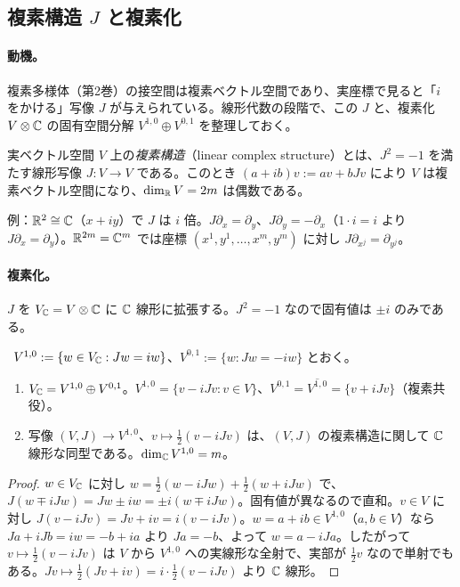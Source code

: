 \subsection{複素構造 $J$ と複素化}
\paragraph{動機。}複素多様体（第2巻）の接空間は複素ベクトル空間であり、実座標で見ると「$i$ をかける」写像 $J$ が与えられている。線形代数の段階で、この $J$ と、複素化 $V\otimes\mathbb C$ の固有空間分解 $V^{1,0}\oplus V^{0,1}$ を整理しておく。

\begin{defn}
実ベクトル空間 $V$ 上の\emph{複素構造}（linear complex structure）とは、$J^2=-1$ を満たす線形写像 $J:V\to V$ である。このとき $(a+ib)v:=av+bJv$ により $V$ は複素ベクトル空間になり、$\dim_{\mathbb R}V=2m$ は偶数である。
\end{defn}

例：$\mathbb R^2\cong\mathbb C$（$x+iy$）で $J$ は $i$ 倍。$J\partial_x=\partial_y$、$J\partial_y=-\partial_x$（$1\cdot i=i$ より $J\partial_x=\partial_y$）。$\mathbb R^{2m}=\mathbb C^m$ では座標 $(x^1,y^1,\dots,x^m,y^m)$ に対し $J\partial_{x^j}=\partial_{y^j}$。

\paragraph{複素化。}$J$ を $V_{\mathbb C}=V\otimes\mathbb C$ に $\mathbb C$ 線形に拡張する。$J^2=-1$ なので固有値は $\pm i$ のみである。

\begin{prop}\label{A:prop:V10}
\tP\ $V^{1,0}:=\{w\in V_{\mathbb C}:Jw=iw\}$、$V^{0,1}:=\{w:Jw=-iw\}$ とおく。
\begin{enumerate}
\item $V_{\mathbb C}=V^{1,0}\oplus V^{0,1}$。$V^{1,0}=\{v-iJv:v\in V\}$、$V^{0,1}=\overline{V^{1,0}}=\{v+iJv\}$（複素共役）。
\item 写像 $(V,J)\to V^{1,0}$、$v\mapsto\frac12(v-iJv)$ は、$(V,J)$ の複素構造に関して $\mathbb C$ 線形な同型である。$\dim_{\mathbb C}V^{1,0}=m$。
\end{enumerate}
\end{prop}
\begin{proof}
$w\in V_{\mathbb C}$ に対し $w=\frac12(w-iJw)+\frac12(w+iJw)$ で、$J(w\mp iJw)=Jw\pm iw=\pm i(w\mp iJw)$。固有値が異なるので直和。$v\in V$ に対し $J(v-iJv)=Jv+iv=i(v-iJv)$。$w=a+ib\in V^{1,0}$（$a,b\in V$）なら $Ja+iJb=iw=-b+ia$ より $Ja=-b$、よって $w=a-iJa$。したがって $v\mapsto\frac12(v-iJv)$ は $V$ から $V^{1,0}$ への実線形な全射で、実部が $\frac12v$ なので単射でもある。$Jv\mapsto\frac12(Jv+iv)=i\cdot\frac12(v-iJv)$ より $\mathbb C$ 線形。
\end{proof}

